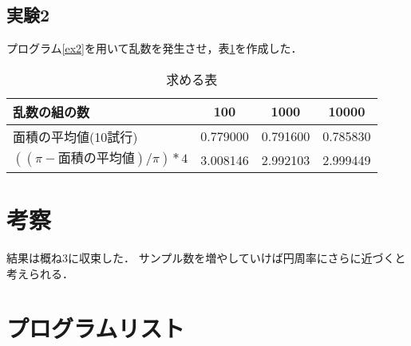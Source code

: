 \documentclass[a4paper,titlepage]{jlreq}
\begin{document}
\subsection{実験2}
プログラム\ref{ex2}を用いて乱数を発生させ，表\ref{tab:ok}を作成した．

\begin{table}[H]
\begin{center}
\caption{求める表}
\begin{tabular}{|l|c|c|c|}
\hline
乱数の組の数               & 100 & 1000 & 10000 \\ \hline
面積の平均値(10試行)         & 0.779000 & 0.791600 & 0.785830  \\ \hline
$((\pi - 面積の平均値) / \pi) * 4$ & 3.008146 & 2.992103 & 2.999449  \\ \hline
\end{tabular}
\label{tab:ok}
\end{center}
\end{table}

\section{考察}
結果は概ね3に収束した．
サンプル数を増やしていけば円周率にさらに近づくと考えられる．


\section{プログラムリスト}

\end{document}
